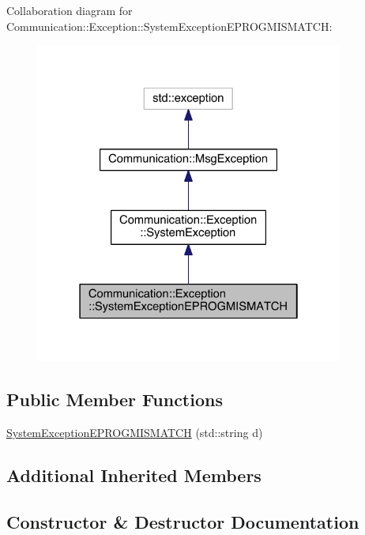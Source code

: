 Collaboration diagram for Communication\+:\+:Exception\+:\+:System\+Exception\+E\+P\+R\+O\+G\+M\+I\+S\+M\+A\+T\+C\+H\+:\nopagebreak
\begin{figure}[H]
\begin{center}
\leavevmode
\includegraphics[width=286pt]{class_communication_1_1_exception_1_1_system_exception_e_p_r_o_g_m_i_s_m_a_t_c_h__coll__graph}
\end{center}
\end{figure}
\subsection*{Public Member Functions}
\begin{DoxyCompactItemize}
\item 
\hyperlink{class_communication_1_1_exception_1_1_system_exception_e_p_r_o_g_m_i_s_m_a_t_c_h_a5e010ee08f1d34dd0129a37696868c63}{System\+Exception\+E\+P\+R\+O\+G\+M\+I\+S\+M\+A\+T\+C\+H} (std\+::string d)
\end{DoxyCompactItemize}
\subsection*{Additional Inherited Members}


\subsection{Constructor \& Destructor Documentation}
\hypertarget{class_communication_1_1_exception_1_1_system_exception_e_p_r_o_g_m_i_s_m_a_t_c_h_a5e010ee08f1d34dd0129a37696868c63}{}
